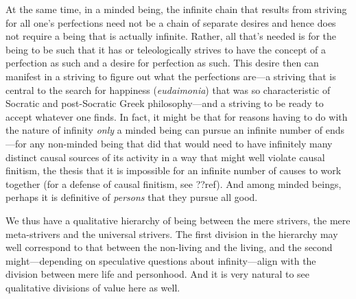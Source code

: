 At the same time, in a minded being, the infinite chain that results from striving for all one's perfections need not be a chain of separate desires
and hence does not require a being that is actually infinite. Rather, all that's needed is for the being to be such that it has or teleologically strives
to have the concept of a perfection as such and a desire for perfection as such. This desire then can manifest in a striving to figure out what the perfections are---a striving that is central to
the search for happiness (\textit{eudaimonia}) that was so characteristic of Socratic and post-Socratic Greek philosophy---and a striving to be ready
to accept whatever one finds. In fact, it might be that for reasons having to do with the nature of infinity \textit{only} a minded being can pursue
an infinite number of ends---for any non-minded being that did that would need to have infinitely many distinct causal sources of its activity in
a way that might well violate causal finitism, the thesis that it is impossible for an infinite number of causes to work together (for a defense
of causal finitism, see ??ref). And among minded beings, perhaps it is definitive of \textit{persons} that they pursue all good.

We thus have a qualitative hierarchy of being between the mere strivers, the mere meta-strivers and the universal strivers. The first division in
the hierarchy may well correspond to that between the non-living and the living, and the second might---depending on speculative questions about
infinity---align with the division between mere life and personhood. And it is very natural to see qualitative divisions of value here as well.

\chaptertail

